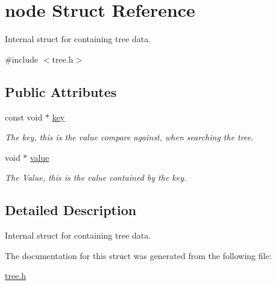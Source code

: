 \hypertarget{structnode}{}\section{node Struct Reference}
\label{structnode}


Internal struct for containing tree data.  




{\ttfamily \#include $<$tree.\+h$>$}

\subsection*{Public Attributes}
\begin{DoxyCompactItemize}
\item 
\mbox{\label{structnode_ad5c7d4cbb4e3bf585d109ac8f38abe71}} 
const void $\ast$ \hyperlink{structnode_ad5c7d4cbb4e3bf585d109ac8f38abe71}{key}
\begin{DoxyCompactList}\small\item\em The key, this is the value compare against, when searching the tree. \end{DoxyCompactList}\item 
\mbox{\label{structnode_a288a44aecd04d7839824d50a0b65982e}} 
void $\ast$ \hyperlink{structnode_a288a44aecd04d7839824d50a0b65982e}{value}
\begin{DoxyCompactList}\small\item\em The Value, this is the value contained by the key. \end{DoxyCompactList}\end{DoxyCompactItemize}


\subsection{Detailed Description}
Internal struct for containing tree data. 

The documentation for this struct was generated from the following file\+:\begin{DoxyCompactItemize}
\item 
\hyperlink{tree_8h}{tree.\+h}\end{DoxyCompactItemize}
